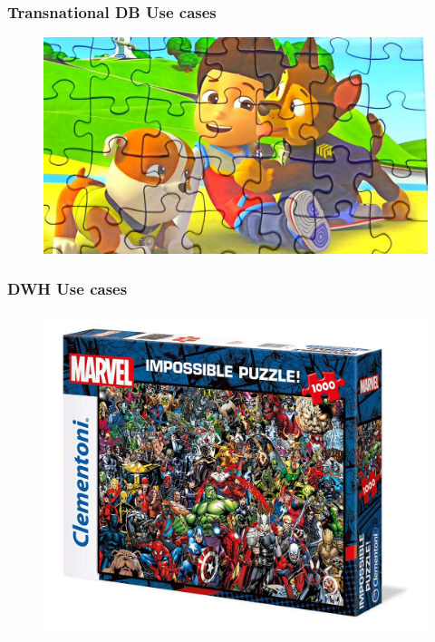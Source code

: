 \begin{frame}
\frametitle{Transnational DB Use cases}
\begin{figure}[ht]

\centering
\includegraphics[width=\linewidth]{./Figures/chapter-01/baby-02.jpg}
\end{figure}
\end{frame}


\begin{frame}
\frametitle{DWH Use cases}
\begin{figure}[ht]

\centering
\includegraphics[width=\linewidth,height=.8\textheight]{./Figures/chapter-01/Marvel-03.jpg}
\end{figure}
\end{frame}

